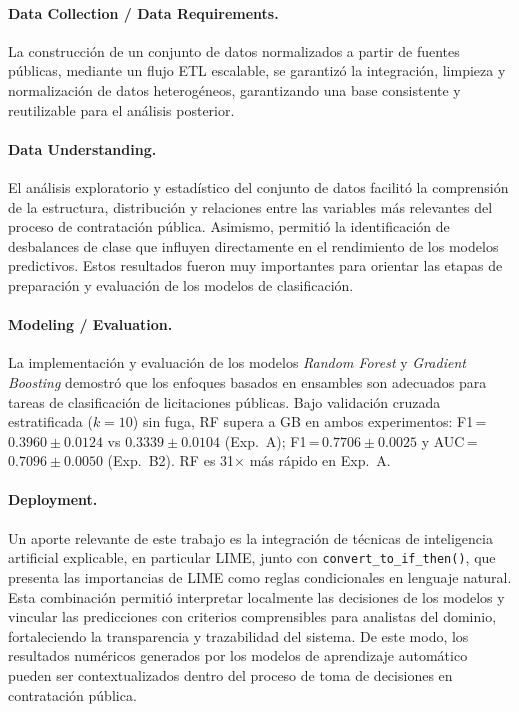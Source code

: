 \documentclass[a4paper,fleqn]{cas-sc}
\begin{document}
\paragraph{\textbf{Data Collection / Data Requirements.}}
La construcción de un conjunto de datos normalizados a partir de fuentes públicas, mediante un flujo ETL escalable, se  garantizó la integración, limpieza y normalización de datos heterogéneos, garantizando una base consistente y reutilizable para el análisis posterior.


\paragraph{\textbf{Data Understanding.}}

El análisis exploratorio y estadístico del conjunto de datos facilitó la comprensión de la estructura, distribución y relaciones entre las variables más relevantes del proceso de contratación pública. Asimismo, permitió la identificación de desbalances de clase que influyen directamente en el rendimiento de los modelos predictivos. Estos resultados fueron muy importantes para orientar las etapas de preparación y evaluación de los modelos de clasificación.

\paragraph{\textbf{Modeling / Evaluation.}}

La implementación y evaluación de los modelos \textit{Random Forest} y \textit{Gradient Boosting} demostró que los enfoques basados en ensambles son adecuados para tareas de clasificación de licitaciones públicas. Bajo validación cruzada estratificada ($k=10$) sin fuga, RF supera a GB en ambos experimentos: F1\,=\,$0.3960 \pm 0.0124$ vs $0.3339 \pm 0.0104$ (Exp.~A); F1\,=\,$0.7706 \pm 0.0025$ y AUC\,=\,$0.7096 \pm 0.0050$ (Exp.~B2). RF es 31$\times$ más rápido en Exp.~A.

\paragraph{\textbf{Deployment.}}
Un aporte relevante de este trabajo es la integración de técnicas de inteligencia artificial explicable, en particular LIME, 
junto con \texttt{convert\_to\_if\_then()}, que presenta las importancias de LIME como reglas condicionales en lenguaje natural.
Esta combinación permitió interpretar localmente las decisiones de los modelos y vincular las predicciones con criterios comprensibles para analistas del dominio, fortaleciendo la transparencia y trazabilidad del sistema. De este modo, los resultados numéricos generados por los modelos de aprendizaje automático pueden ser contextualizados dentro del proceso de toma de decisiones en contratación pública.
\end{document}
